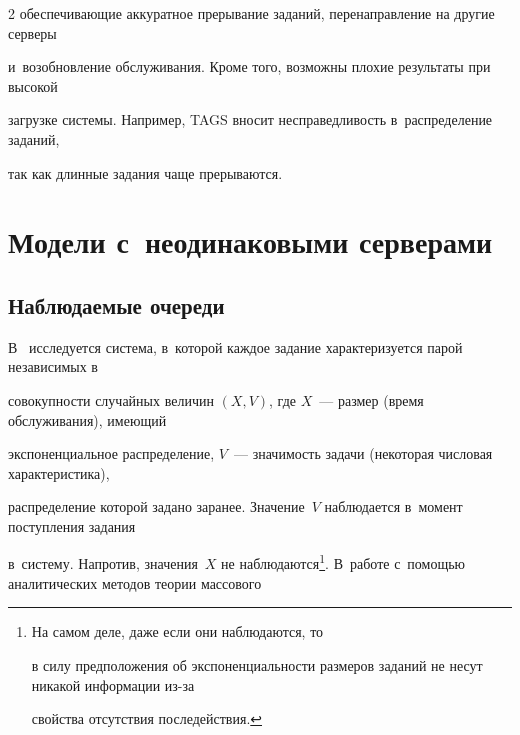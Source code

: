 \begin{multicols}{2}
обеспечивающие аккуратное прерывание заданий, перенаправление на другие серверы 


и~возобновление обслуживания. Кроме того, возможны плохие результаты при высокой 


загрузке системы. Например, TAGS вносит несправедливость в~распределение заданий, 


так как длинные задания чаще прерываются.





\vspace*{-2pt}





\section{Модели с~неодинаковыми серверами}










\subsection{Наблюдаемые очереди}










В~\cite{31-kon} исследуется система, в~которой каждое задание характеризуется парой независимых в~


совокупности случайных величин $(X,V)$, где $X$~--- размер (время обслуживания), имеющий 


экспоненциальное распределение, $V$~--- значимость задачи (некоторая числовая характеристика), 


распределение которой задано заранее. Значение~$V$ наблюдается в~момент поступления задания 


в~систему. Напротив, значения~$X$ не наблюдаются\footnote{На самом деле, даже если они наблюдаются, то 


в силу предположения об экспоненциальности размеров заданий не несут никакой информации из-за 


свойства отсутствия последействия.}. В~работе с~помощью аналитических методов теории массового 



\end{multicols}
